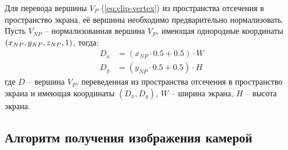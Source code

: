 Для перевода вершины $V_P$ (\ref{eq:clip-vertex}) из пространства отсечения в пространство экрана, её вершины необходимо предварительно нормализовать. Пусть $V_{NP}$ -- нормализованная вершина $V_P$, имеющая однородные координаты $(x_{NP}, y_{NP}, \\ z_{NP}, 1)$, тогда:
\begin{equation}
	\begin{aligned}
		D_x &= (x_{NP} \cdot 0.5 + 0.5) \cdot W \\
		D_y &= (y_{NP} \cdot 0.5 + 0.5) \cdot H
	\end{aligned}
\end{equation}
где $D$ -- вершина $V_P$, переведенная из пространства отсечения в пространство экрана и имеющая координаты $(D_x, D_y)$, $W$ -- ширина экрана, $H$ -- высота экрана.

\subsection{Алгоритм получения изображения камерой}

